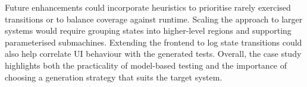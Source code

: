 Future enhancements could incorporate heuristics to prioritise rarely exercised
transitions or to balance coverage against runtime. Scaling the approach to larger systems would require grouping states
into higher-level regions and supporting parameterised submachines. Extending the
frontend to log state transitions could also help correlate UI behaviour with the
generated tests. Overall, the case study highlights both the practicality of
model-based testing and the importance of choosing a generation strategy that
suits the target system.
